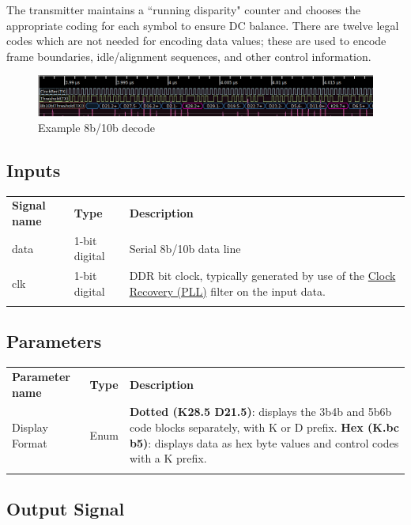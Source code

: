 The transmitter maintains a ``running disparity" counter and chooses the appropriate coding for each symbol to ensure
DC balance. There are twelve legal codes which are not needed for encoding data values; these are used to encode
frame boundaries, idle/alignment sequences, and other control information.

\begin{figure}[h]
\centering
\includegraphics[width=16cm]{images/filters/8b10b.png}
\caption{Example 8b/10b decode}
\label{filter_8b10b}
\end{figure}

\subsection{Inputs}

\begin{tabularx}{16cm}{llX}
\thickhline
\textbf{Signal name} & \textbf{Type} & \textbf{Description} \\
\thickhline
data & 1-bit digital & Serial 8b/10b data line \\
\thickhline
clk & 1-bit digital & DDR bit clock, typically generated by use of the \hyperref[filter:cdrpll]{Clock Recovery
(PLL)} filter on the input data.\\
\thickhline
\end{tabularx}

\subsection{Parameters}

\begin{tabularx}{16cm}{llX}
\thickhline
\textbf{Parameter name} & \textbf{Type} & \textbf{Description} \\
\thickhline
Display Format & Enum &
	\textbf{Dotted (K28.5 D21.5)}: displays the 3b4b and 5b6b code blocks separately, with K or D prefix. \newline
	\textbf{Hex (K.bc b5)}: displays data as hex byte values and control codes with a K prefix. \\
\thickhline
\end{tabularx}

\subsection{Output Signal}

